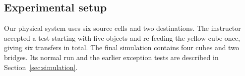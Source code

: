 \subsection{Experimental setup}
Our physical system uses six source cells and two destinations. The instructor accepted a test starting with five objects and re-feeding the yellow cube once, giving six transfers in total. The final simulation contains four cubes and two bridges. Its normal run and the earlier exception tests are described in Section~\ref{sec:simulation}.
